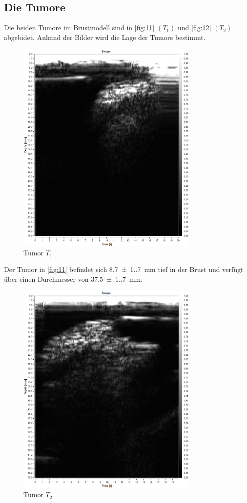 \subsection{Die Tumore}
Die beiden Tumore im Brustmodell sind in \autoref{fig:11} $\left(T_1\right)$ 
und \autoref{fig:12} $\left(T_2\right)$ abgebidet. Anhand der Bilder wird die
Lage der Tumore bestimmt.
\begin{figure}[H]
  \centering
  \caption{Tumor $T_1$}
  \label{fig:11}
  \includegraphics[width=0.8\textwidth]{Bilder/BrustA1.png}
\end{figure}
\noindent Der Tumor in \autoref{fig:11} befindet sich \qty{8.7(1.7)}{\mm} tief
in der Brust und verfügt über einen Durchmesser von \qty{37.5(1.7)}{\mm}.
\begin{figure}[H]
  \centering
  \caption{Tumor $T_2$}
  \label{fig:12}
  \includegraphics[width=0.8\textwidth]{Bilder/BrustB1.png}
\end{figure}
